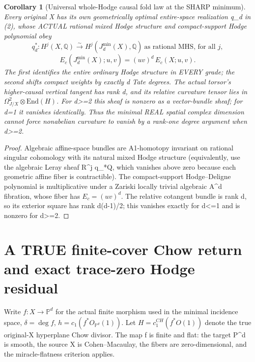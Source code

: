 \documentclass[11pt]{article}
\newtheorem{corollary}[theorem]{Corollary}
\begin{document}
\begin{corollary}[Universal whole-Hodge causal fold law at the SHARP minimum]
Every original X has its own
geometrically optimal entire-space
realization q_d in (2), whose ACTUAL
rational mixed Hodge structure and
compact-support Hodge polynomial obey
\[
 \boxed{
 q_d^*:H^j(X,\mathbb Q)
    \overset{\sim}{\longrightarrow}
      H^j(J_d^{\min}(X),\mathbb Q)
 \ \text{as rational MHS, for all }j,}
                                                               \tag{5}
\]
\[
 \boxed{
 E_c(J_d^{\min}(X);u,v)
    =(uv)^d\,E_c(X;u,v).
 }                                                       \tag{6}
\]
The first identifies the entire
ordinary Hodge structure in EVERY
grade; the second shifts compact
weights by exactly d Tate degrees.
The actual torsor's higher-causal
vertical tangent has rank d,
and its relative curvature tensor
lies in
$\Omega_{J/X}^2\otimes\mathrm{End}(H)$.
For d>=2 this sheaf is nonzero
as a vector-bundle sheaf;
for d=1 it vanishes identically.
Thus the minimal REAL spatial
complex dimension cannot force
nonabelian curvature to vanish
by a rank-one degree argument
when d>=2.
\end{corollary}
\begin{proof}
Algebraic affine-space bundles
are A1-homotopy invariant on
rational singular cohomology
with its natural mixed Hodge
structure (equivalently, use the
algebraic Leray sheaf R^j q_*Q,
which vanishes above zero
because each geometric affine
fiber is contractible).
The compact-support
Hodge--Deligne polynomial is
multiplicative under a
Zariski locally trivial
algebraic A^d fibration,
whose fiber has $E_c=(uv)^d$.
The relative cotangent bundle
is rank d, so its exterior
square has rank d(d-1)/2;
this vanishes exactly for
d<=1 and is nonzero for d>=2.
\end{proof}

\section{A TRUE finite-cover Chow return and exact trace-zero Hodge residual}
Write $f:X\to\mathbb P^d$ for
the actual finite morphism
used in the minimal incidence
space, $\delta=\deg f$,
$h=c_1(f^*O_{\mathbb P^d}(1))$.
Let $H=c_1^{CH}(f^*O(1))$ denote
the true original-X
hyperplane Chow divisor.
The map f is finite and flat:
the target P^d is smooth,
the source X is Cohen--Macaulay,
the fibers are zero-dimensional,
and the miracle-flatness
criterion applies.
\end{document}
